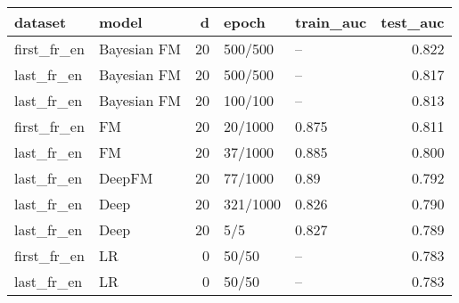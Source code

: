 \begin{tabular}{llrllr}
\toprule
     dataset &        model &   d &     epoch & train\_auc &  test\_auc \\
\midrule
 first\_fr\_en &  Bayesian FM &  20 &   500/500 &        -- &     0.822 \\
  last\_fr\_en &  Bayesian FM &  20 &   500/500 &        -- &     0.817 \\
  last\_fr\_en &  Bayesian FM &  20 &   100/100 &        -- &     0.813 \\
 first\_fr\_en &           FM &  20 &   20/1000 &     0.875 &     0.811 \\
  last\_fr\_en &           FM &  20 &   37/1000 &     0.885 &     0.800 \\
  last\_fr\_en &       DeepFM &  20 &   77/1000 &      0.89 &     0.792 \\
  last\_fr\_en &         Deep &  20 &  321/1000 &     0.826 &     0.790 \\
  last\_fr\_en &         Deep &  20 &       5/5 &     0.827 &     0.789 \\
 first\_fr\_en &           LR &   0 &     50/50 &        -- &     0.783 \\
  last\_fr\_en &           LR &   0 &     50/50 &        -- &     0.783 \\
\bottomrule
\end{tabular}
